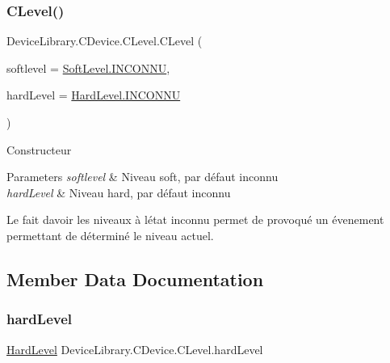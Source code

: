 \subsubsection{\texorpdfstring{C\+Level()}{CLevel()}}
{\footnotesize\ttfamily Device\+Library.\+C\+Device.\+C\+Level.\+C\+Level (\begin{DoxyParamCaption}\item[{\mbox{\hyperlink{class_device_library_1_1_c_device_1_1_c_level_a83c2976bc299331f1c355e806299bb1f}{Soft\+Level}}}]{softlevel = {\ttfamily \mbox{\hyperlink{class_device_library_1_1_c_device_1_1_c_level_a83c2976bc299331f1c355e806299bb1fab741d43a8209dcfcf03bb781061689a8}{Soft\+Level.\+I\+N\+C\+O\+N\+NU}}},  }\item[{\mbox{\hyperlink{class_device_library_1_1_c_device_1_1_c_level_a3f3169da53d5beebdac25e401982101a}{Hard\+Level}}}]{hard\+Level = {\ttfamily \mbox{\hyperlink{class_device_library_1_1_c_device_1_1_c_level_a3f3169da53d5beebdac25e401982101aab741d43a8209dcfcf03bb781061689a8}{Hard\+Level.\+I\+N\+C\+O\+N\+NU}}} }\end{DoxyParamCaption})\hspace{0.3cm}{\ttfamily [inline]}}



Constructeur 


\begin{DoxyParams}{Parameters}
{\em softlevel} & Niveau soft, par défaut inconnu\\
\hline
{\em hard\+Level} & Niveau hard, par défaut inconnu\\
\hline
\end{DoxyParams}


Le fait d\textquotesingle{}avoir les niveaux à l\textquotesingle{}état inconnu permet de provoqué un évenement permettant de déterminé le niveau actuel.

\subsection{Member Data Documentation}
\mbox{\label{class_device_library_1_1_c_device_1_1_c_level_ad1e4887c141b007c70d3dd0faa3a2d17}} 
\subsubsection{\texorpdfstring{hard\+Level}{hardLevel}}
{\footnotesize\ttfamily \mbox{\hyperlink{class_device_library_1_1_c_device_1_1_c_level_a3f3169da53d5beebdac25e401982101a}{Hard\+Level}} Device\+Library.\+C\+Device.\+C\+Level.\+hard\+Level}



